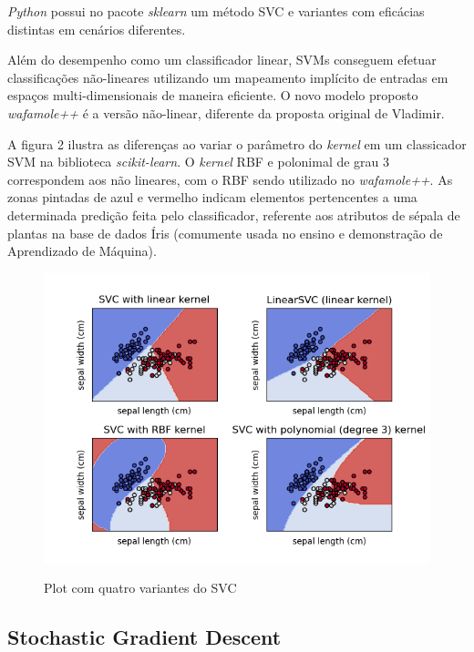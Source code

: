 \textit{Python} possui no pacote \textit{sklearn} um método SVC e variantes com eficácias distintas em cenários diferentes.

Além do desempenho como um classificador linear, SVMs conseguem efetuar classificações não-lineares utilizando um mapeamento implícito de entradas em espaços multi-dimensionais de maneira eficiente. O novo modelo proposto \textit{wafamole++} é a versão não-linear, diferente da proposta original de Vladimir.

A figura 2 ilustra as diferenças ao variar o parâmetro do \textit{kernel} em um classicador SVM na biblioteca \textit{scikit-learn}. O \textit{kernel} RBF e polonimal de grau 3 correspondem aos não lineares, com o RBF sendo utilizado no \textit{wafamole++}. As zonas pintadas de azul e vermelho indicam elementos pertencentes a uma determinada predição feita pelo classificador, referente aos atributos de sépala de plantas na base de dados Íris (comumente usada no ensino e demonstração de Aprendizado de Máquina).

\begin{figure}[ht]
    \centering
    \caption{Plot com quatro variantes do SVC}
    \includegraphics[width=14cm]{figuras/plot-svc.png} 
    \label{fig:internet} 
\end{figure}

\subsection{Stochastic Gradient Descent}

